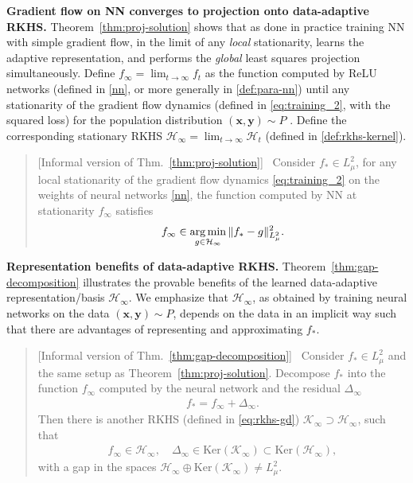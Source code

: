 \documentclass[11pt]{article}
\numberwithin{equation}{section}
\def\argmin{\operatornamewithlimits{arg\,min}}
\def\bd#1{\mathbf{#1}}
\def\bx{\bd{x}}
\def\by{\bd{y}}
\begin{document}
\noindent \textbf{Gradient flow on NN converges to projection onto data-adaptive RKHS.}
Theorem~\ref{thm:proj-solution} shows that as done in practice training NN with simple gradient flow, in the limit of any \textit{local} stationarity, learns the adaptive representation, and performs the \textit{global} least squares projection simultaneously. Define $f_\infty = \lim_{t \rightarrow \infty} f_t$ as the function computed by ReLU networks (defined in \eqref{nn}, or more generally in \eqref{def:para-nn}) until any stationarity of the gradient flow dynamics (defined in \eqref{eq:training_2}, with the squared loss) for the population distribution $(\bx, \by)\sim P$ . Define the corresponding stationary RKHS $\mathcal{H}_\infty = \lim_{t \rightarrow \infty} \mathcal{H}_t$ (defined in \eqref{def:rkhs-kernel}). 
\begin{quote}[Informal version of Thm.~\ref{thm:proj-solution}]~
    Consider $f_* \in L^2_\mu$, for any local stationarity of the gradient flow dynamics \eqref{eq:training_2} on the weights of neural networks \eqref{nn}, the function computed by NN at stationarity $f_\infty$ satisfies
    \begin{align*}
        f_\infty \in \argmin_{g \in \mathcal{H}_\infty} \| f_* - g \|_{L^2_\mu}^2.
    \end{align*}
\end{quote}



\noindent \textbf{Representation benefits of data-adaptive RKHS.} 
Theorem~\ref{thm:gap-decomposition} illustrates the provable benefits of the learned data-adaptive representation/basis $\mathcal{H}_\infty$. We emphasize that $\mathcal{H}_\infty$, as obtained by training neural networks on the data $(\bx, \by)\sim P$, depends on the data in an implicit way such that there are advantages of representing and approximating $f_*$.

\begin{quote}[Informal version of Thm.~\ref{thm:gap-decomposition}]~
    Consider $f_* \in L^2_\mu$ and the same setup as Theorem~\ref{thm:proj-solution}. Decompose $f_*$ into the function $f_\infty$ computed by the neural network and the residual $\Delta_\infty$
    \begin{align*}
        f_* = f_\infty + \Delta_\infty.
    \end{align*}
    Then there is another RKHS (defined in \eqref{eq:rkhs-gd}) $\mathcal{K}_\infty \supset \mathcal{H}_\infty$, such that
    \begin{align*}
        f_\infty \in \mathcal{H}_\infty ,\quad
        \Delta_\infty \in \text{Ker}(\mathcal{K}_\infty) \subset \text{Ker}(\mathcal{H}_\infty),
    \end{align*} with a gap in the spaces $\mathcal{H}_\infty \oplus \text{Ker}(\mathcal{K}_\infty) \neq L^2_\mu$.
\end{quote}
\end{document}
